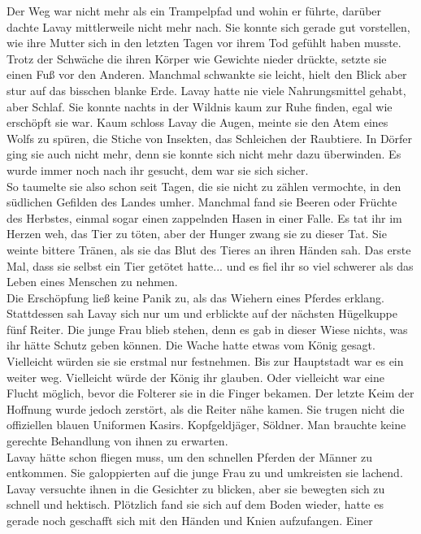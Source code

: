 Der Weg war nicht mehr als ein Trampelpfad und wohin er führte, darüber dachte Lavay mittlerweile 
nicht mehr nach. Sie konnte sich gerade gut vorstellen, wie ihre Mutter sich in den letzten Tagen 
vor ihrem Tod gefühlt haben musste. Trotz der Schwäche die ihren Körper wie Gewichte nieder 
drückte, setzte sie einen Fuß vor den Anderen. Manchmal schwankte sie leicht, hielt den Blick aber 
stur auf das bisschen blanke Erde. Lavay hatte nie viele Nahrungsmittel gehabt, aber Schlaf. Sie 
konnte nachts in der Wildnis kaum zur Ruhe finden, egal wie erschöpft sie war. Kaum schloss Lavay 
die Augen, meinte sie den Atem eines Wolfs zu spüren, die Stiche von Insekten, das Schleichen der 
Raubtiere. In Dörfer ging sie auch nicht mehr, denn sie konnte sich nicht mehr dazu 
überwinden. Es wurde immer noch nach ihr gesucht, dem war sie sich sicher.\\
So taumelte sie also schon seit Tagen, die sie nicht zu zählen vermochte, in den südlichen Gefilden 
des Landes umher. Manchmal fand sie Beeren oder Früchte des Herbstes, einmal sogar einen zappelnden 
Hasen in einer Falle. Es tat ihr im Herzen weh, das Tier zu töten, aber der Hunger zwang sie zu 
dieser Tat. Sie weinte bittere Tränen, als sie das Blut des Tieres an ihren Händen sah. Das erste 
Mal, dass sie selbst ein Tier getötet hatte... und es fiel ihr so viel schwerer als das Leben eines 
Menschen zu nehmen.\\
Die Erschöpfung ließ keine Panik zu, als das Wiehern eines Pferdes erklang. Stattdessen sah Lavay 
sich nur um und erblickte auf der nächsten Hügelkuppe fünf Reiter. Die junge Frau blieb stehen, 
denn es gab in dieser Wiese nichts, was ihr hätte Schutz geben können. Die Wache hatte etwas vom 
König gesagt. Vielleicht würden sie sie erstmal nur festnehmen. Bis zur Hauptstadt war es ein 
weiter weg. Vielleicht würde der König ihr glauben. Oder vielleicht war eine Flucht möglich, bevor 
die Folterer sie in die Finger bekamen. Der letzte Keim der Hoffnung wurde jedoch zerstört, als die 
Reiter nähe kamen. Sie trugen nicht die offiziellen blauen Uniformen Kasirs. Kopfgeldjäger, 
Söldner. Man brauchte keine gerechte Behandlung von ihnen zu erwarten.\\ 
Lavay hätte schon fliegen muss, um den schnellen Pferden der Männer zu entkommen. Sie 
galoppierten auf die junge Frau zu und umkreisten sie lachend. Lavay versuchte ihnen in die 
Gesichter zu blicken, aber sie bewegten sich zu schnell und hektisch. Plötzlich fand sie sich auf 
dem Boden wieder, hatte es gerade noch geschafft sich mit den Händen und Knien aufzufangen. Einer 
